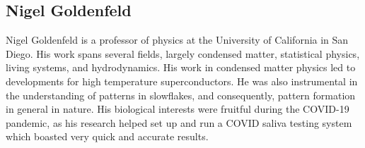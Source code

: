 \subsection{Nigel Goldenfeld}

Nigel Goldenfeld is a professor of physics at the University of California in San Diego. His work spans several fields, largely condensed matter, statistical physics, living systems, and hydrodynamics. His work in condensed matter physics led to developments for high temperature superconductors. He was also instrumental in the understanding of patterns in slowflakes, and consequently, pattern formation in general in nature. His biological interests were fruitful during the COVID-19 pandemic, as his research helped set up and run a COVID saliva testing system which boasted very quick and accurate results.




